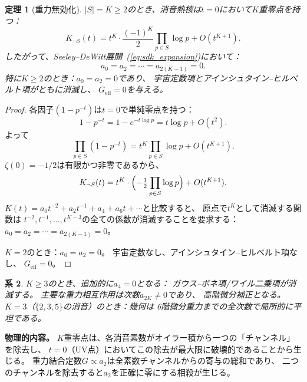 \documentclass[a4paper,11pt]{article}
\newtheorem{theorem}{定理}
\newtheorem{corollary}[theorem]{系}
\begin{document}
\begin{theorem}[重力無効化]
\label{thm:nullification}
$|S| = K \geq 2$のとき、消音熱核は$t = 0$において$K$重零点を持つ：
\begin{equation}
  K_{\neg S}(t) = t^K \cdot \frac{(-1)^K}{2}
  \prod_{p \in S}\log p + O(t^{K+1}).
\end{equation}
したがって、Seeley--DeWitt展開~(\ref{eq:sdk_expansion})において：
\begin{equation}
  a_0 = a_2 = \cdots = a_{2(K-1)} = 0.
\end{equation}
特に$K \geq 2$のとき：$a_0 = a_2 = 0$であり、
宇宙定数項とアインシュタイン--ヒルベルト項がともに消滅し、
$G_{\mathrm{eff}} = 0$を与える。
\end{theorem}

\begin{proof}
各因子$(1 - p^{-t})$は$t = 0$で単純零点を持つ：
\begin{equation}
  1 - p^{-t} = 1 - e^{-t\log p} = t\log p + O(t^2).
\end{equation}
よって
\begin{equation}
  \prod_{p \in S}(1 - p^{-t}) = t^K \prod_{p\in S}\log p + O(t^{K+1}).
\end{equation}
$\zeta(0) = -1/2$は有限かつ非零であるから、
\begin{equation}
  K_{\neg S}(t) = t^K \cdot \Bigl(-\tfrac{1}{2}\prod_{p\in S}\log p\Bigr)
  + O(t^{K+1}).
\end{equation}
$K(t) = a_0 t^{-2} + a_2 t^{-1} + a_4 + a_6 t + \cdots$と比較すると、
原点で$t^K$として消滅する関数は
$t^{-2}, t^{-1}, \ldots, t^{K-3}$の全ての係数が消滅することを要求する：
$a_0 = a_2 = \cdots = a_{2(K-1)} = 0$。

$K = 2$のとき：$a_0 = a_2 = 0$。
宇宙定数なし、アインシュタイン--ヒルベルト項なし、
$G_{\mathrm{eff}} = 0$。
\end{proof}

\begin{corollary}
$K \geq 3$のとき、追加的に$a_4 = 0$となる：
ガウス--ボネ項/ワイル二乗項が消滅する。
主要な重力相互作用は次数$a_{2K} \neq 0$であり、
高階微分補正となる。
$K = 3$（$\{2,3,5\}$の消音）のとき：幾何は
6階微分重力までの全次数で局所的に平坦である。
\end{corollary}

\textbf{物理的内容。}
$K$重零点は、各消音素数がオイラー積から一つの「チャンネル」を除去し、
$t = 0$（UV点）においてこの除去が最大限に破壊的であることから生じる。
重力結合定数$G \propto a_2$は全素数チャンネルからの寄与の総和であり、
二つのチャンネルを除去すると$a_2$を正確に零にする相殺が生じる。
\end{document}
